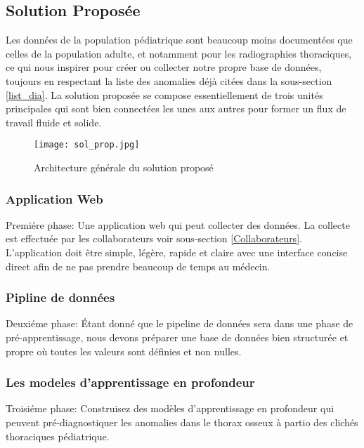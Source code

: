         \subsection{Solution Proposée}\label{Solution_prop}
            Les  données de la population pédiatrique sont beaucoup moins documentées que celles de la population adulte, et notamment pour les radiographies thoraciques, ce qui nous inspirer pour créer ou collecter notre propre base de données, toujours en respectant la liste des anomalies déjà citées dans la sous-section \ref{list_dia}.
            La solution proposée se compose essentiellement de trois unités principales qui sont bien connectées les unes aux autres pour former un flux de travail fluide et solide.
            \begin{figure}[H]
                \centering
                \texttt{[image: sol\_prop.jpg]}
                \caption{Architecture générale du solution proposé}\label{fig:sol_prop}
            \end{figure}
            \subsubsection*{Application Web}
                Premiére phase:
                Une application web qui peut collecter des données. La collecte est effectuée par les collaborateurs voir sous-section \ref{Collaborateurs}. L'application doit être simple, légère, rapide et claire avec une interface concise direct afin de ne pas prendre beaucoup de temps au médecin.
            \subsubsection*{Pipline de données}
                Deuxiéme phase:
                Étant donné que le pipeline de données sera dans une phase de pré-apprentissage, nous devons préparer une base de données bien structurée et propre où toutes les valeurs sont définies et non nulles.
            \subsubsection*{Les modeles d'apprentissage en profondeur}
                Troisiéme phase:
                Construisez des modèles d'apprentissage en profondeur qui peuvent pré-diagnostiquer les anomalies dans le thorax osseux à partio des clichés thoraciques pédiatrique.


